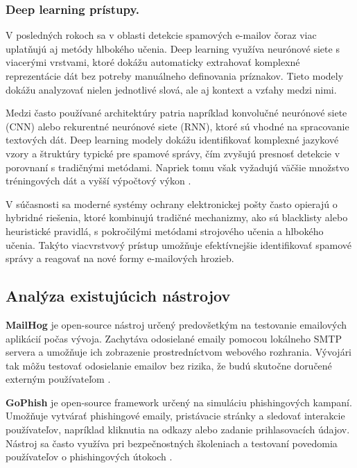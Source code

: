 \documentclass[conference]{IEEEtran}
\begin{document}
\subsubsection*{Deep learning prístupy.}

V posledných rokoch sa v oblasti detekcie spamových e-mailov čoraz viac uplatňujú aj metódy hlbokého učenia. Deep learning využíva neurónové siete s viacerými vrstvami, ktoré dokážu automaticky extrahovať komplexné reprezentácie dát bez potreby manuálneho definovania príznakov. Tieto modely dokážu analyzovať nielen jednotlivé slová, ale aj kontext a vzťahy medzi nimi\cite{karim2019spam}.

Medzi často používané architektúry patria napríklad konvolučné neurónové siete (CNN) alebo rekurentné neurónové siete (RNN), ktoré sú vhodné na spracovanie textových dát. Deep learning modely dokážu identifikovať komplexné jazykové vzory a štruktúry typické pre spamové správy, čím zvyšujú presnosť detekcie v porovnaní s tradičnými metódami. Napriek tomu však vyžadujú väčšie množstvo tréningových dát a vyšší výpočtový výkon \cite{karim2019spam}.

V súčasnosti sa moderné systémy ochrany elektronickej pošty často opierajú o hybridné riešenia, ktoré kombinujú tradičné mechanizmy, ako sú blacklisty alebo heuristické pravidlá, s pokročilými metódami strojového učenia a hlbokého učenia. Takýto viacvrstvový prístup umožňuje efektívnejšie identifikovať spamové správy a reagovať na nové formy e-mailových hrozieb\cite{karim2019spam}.


\subsection{Analýza existujúcich nástrojov}

\textbf{MailHog} je open-source nástroj určený predovšetkým na testovanie emailových aplikácií počas vývoja. Zachytáva odosielané emaily pomocou lokálneho SMTP servera a umožňuje ich zobrazenie prostredníctvom webového rozhrania. Vývojári tak môžu testovať odosielanie emailov bez rizika, že budú skutočne doručené externým používateľom \cite{mailhog}.

\textbf{GoPhish} je open-source framework určený na simuláciu phishingových kampaní. Umožňuje vytvárať phishingové emaily, pristávacie stránky a sledovať interakcie používateľov, napríklad kliknutia na odkazy alebo zadanie prihlasovacích údajov. Nástroj sa často využíva pri bezpečnostných školeniach a testovaní povedomia používateľov o phishingových útokoch \cite{gophish}.
\end{document}
